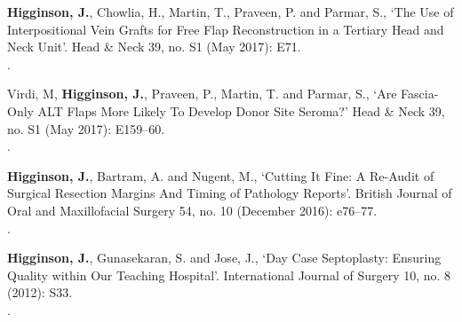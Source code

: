 \vspace{0.1cm}

 \textbf{Higginson, J.}, Chowlia, H., Martin, T., Praveen, P. and Parmar, S., `The Use of Interpositional Vein Grafts for Free Flap Reconstruction in a Tertiary Head and Neck Unit’. Head \& Neck 39, no. S1 (May 2017): E71. 
\\.

\vspace{0.1cm}

 Virdi, M, \textbf{Higginson, J.}, Praveen, P., Martin, T. and Parmar, S., `Are Fascia-Only ALT Flaps More Likely To Develop Donor Site Seroma?’ Head \& Neck 39, no. S1 (May 2017): E159–60. 
\\.

\vspace{0.1cm}

 \textbf{Higginson, J.}, Bartram, A. and Nugent, M., `Cutting It Fine: A Re-Audit of Surgical Resection Margins And Timing of Pathology Reports’. British Journal of Oral and Maxillofacial Surgery 54, no. 10 (December 2016): e76–77. 
\\.

\vspace{0.1cm}

 \textbf{Higginson, J.}, Gunasekaran, S. and Jose, J., `Day Case Septoplasty: Ensuring Quality within Our Teaching Hospital’. International Journal of Surgery 10, no. 8 (2012): S33. 
\\.



